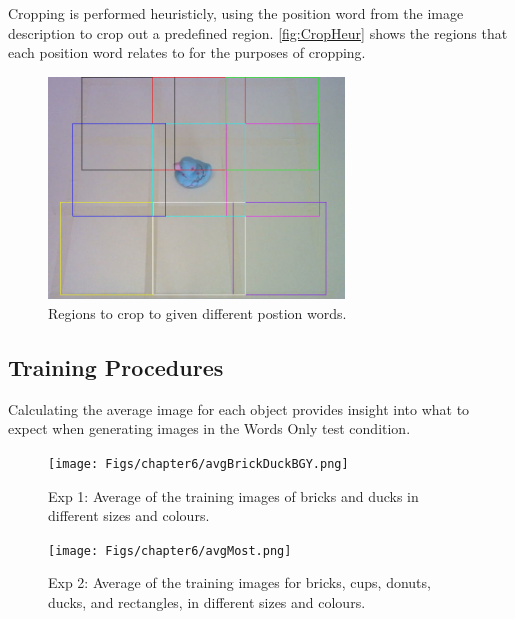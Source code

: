 Cropping is performed heuristicly, using the position word from the image description to crop out a predefined region. \autoref{fig:CropHeur} shows the regions that each position word relates to for the purposes of cropping.

\begin{figure}[ht]
    \centering
    \includegraphics[width=0.7\textwidth]{Figs/chapter6/cropHeuristics.png}
    \caption{Regions to crop to given different postion words.}
    \label{fig:CropHeur}
\end{figure}



\subsection{Training Procedures}

Calculating the average image for each object provides insight into what to expect when generating images in the Words Only test condition.


\begin{figure}[ht]
    \centering
    \texttt{[image: Figs/chapter6/avgBrickDuckBGY.png]}
    \caption{Exp 1: Average of the training images of bricks and ducks in different sizes and colours.}
    \label{fig:AvgBrickDuck}
\end{figure}

\begin{figure}[ht]
    \centering
    \texttt{[image: Figs/chapter6/avgMost.png]}
    \caption{Exp 2: Average of the training images for bricks, cups, donuts, ducks, and rectangles, in different sizes and colours.}
    \label{fig:avgMost}
\end{figure}

